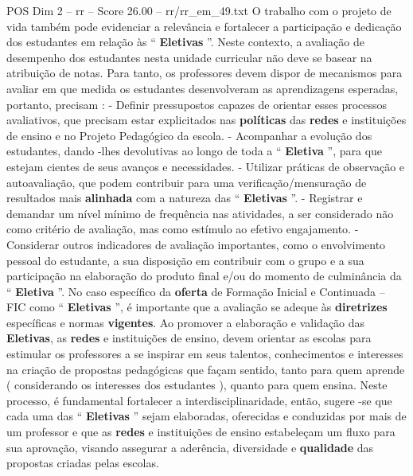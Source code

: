 \begin{textsample}{POS Dim 2 – rr – Score 26.00 – rr/rr\_em\_49.txt}
O trabalho com o projeto de vida também pode evidenciar a relevância e fortalecer a participação e dedicação dos estudantes em relação às “ \textbf{Eletivas} ”.
Neste contexto, a avaliação de desempenho dos estudantes nesta unidade curricular não deve se basear na atribuição de notas.
Para tanto, os professores devem dispor de mecanismos para avaliar em que medida os estudantes desenvolveram as aprendizagens esperadas, portanto, precisam : - Definir pressupostos capazes de orientar esses processos avaliativos, que precisam estar explicitados nas \textbf{políticas} das \textbf{redes} e instituições de ensino e no Projeto Pedagógico da escola. - Acompanhar a evolução dos estudantes, dando -lhes devolutivas ao longo de toda a “ \textbf{Eletiva} ”, para que estejam cientes de seus avanços e necessidades. - Utilizar práticas de observação e autoavaliação, que podem contribuir para uma verificação/mensuração de resultados mais \textbf{alinhada} com a natureza das “ \textbf{Eletivas} ”. - Registrar e demandar um nível mínimo de frequência nas atividades, a ser considerado não como critério de avaliação, mas como estímulo ao efetivo engajamento. - Considerar outros indicadores de avaliação importantes, como o envolvimento pessoal do estudante, a sua disposição em contribuir com o grupo e a sua participação na elaboração do produto final e/ou do momento de culminância da “ \textbf{Eletiva} ”.
No caso específico da \textbf{oferta} de Formação Inicial e Continuada – FIC como “ \textbf{Eletivas} ”, é importante que a avaliação se adeque às \textbf{diretrizes} específicas e normas \textbf{vigentes}.
Ao promover a elaboração e validação das \textbf{Eletivas}, as \textbf{redes} e instituições de ensino, devem orientar as escolas para estimular os professores a se inspirar em seus talentos, conhecimentos e interesses na criação de propostas pedagógicas que façam sentido, tanto para quem aprende ( considerando os interesses dos estudantes ), quanto para quem ensina.
Neste processo, é fundamental fortalecer a interdisciplinaridade, então, sugere -se que cada uma das “ \textbf{Eletivas} ” sejam elaboradas, oferecidas e conduzidas por mais de um professor e que as \textbf{redes} e instituições de ensino estabeleçam um fluxo para sua aprovação, visando assegurar a aderência, diversidade e \textbf{qualidade} das propostas criadas pelas escolas.

\end{textsample}
